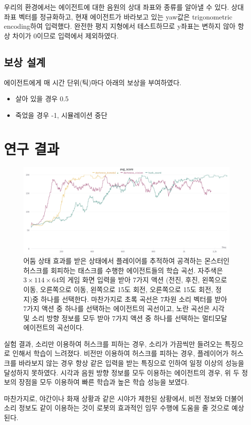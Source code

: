 \documentclass{tudelftposter}
\begin{document}
우리의 환경에서는 에이전트에 대한 음원의 상대 좌표와 종류를 알아낼 수 있다. 상대 좌표 벡터를 정규화하고, 현재 에이전트가 바라보고 있는 yaw값은 trigonometric encoding하여 입력했다. 완전한 평지 지형에서 테스트하므로 y좌표는 변하지 않아 항상 차이가 0이므로 입력에서 제외하였다. 

\subsection{보상 설계}
에이전트에게 매 시간 단위(틱)마다 아래의 보상을 부여하였다.
\begin{itemize}
  \item 살아 있을 경우 0.5
  \item 죽었을 경우 -1, 시뮬레이션 중단
\end{itemize}

\section{연구 결과}

\begin{figure}
  \centering
  \includegraphics[width=.5\textwidth]{result.png}
  \caption{어둠 상태 효과를 받은 상태에서 플레이어를 추적하여 공격하는 몬스터인 허스크를 회피하는 태스크를 수행한 에이전트들의 학습 곡선. 자주색은 $3\times114\times64$의 게임 화면 입력을 받아 7가지 액션 (전진, 후진, 왼쪽으로 이동, 오른쪽으로 이동, 왼쪽으로 15도 회전, 오른쪽으로 15도 회전, 정지)중 하나를 선택한다. 마찬가지로 초록 곡선은 7차원 소리 벡터를 받아 7가지 액션 중 하나를 선택하는 에이전트의 곡선이고, 노란 곡선은 시각 및 소리 방향 정보를 모두 받아 7가지 액션 중 하나를 선택하는 멀티모달 에이전트의 곡선이다.}
  \label{fig:block}
\end{figure}
실험 결과, 소리만 이용하여 허스크를 피하는 경우, 소리가 가끔씩만 들려오는 특징으로 인해서 학습이 느려졌다. 비전만 이용하여 허스크를 피하는 경우, 플레이어가 허스크를 바라보지 않는 경우 항상 같은 입력을 받는 특징으로 인하여 일정 이상의 성능을 달성하지 못하였다. 시각과 음원 방향 정보를 모두 이용하는 에이전트의 경우, 위 두 정보의 장점을 모두 이용하여 빠른 학습과 높은 학습 성능을 보였다.

마찬가지로, 야간이나 화재 상황과 같은 시야가 제한된 상황에서, 비전 정보와 더불어 소리 정보도 같이 이용하는 것이 로봇의 효과적인 임무 수행에 도움을 줄 것으로 예상된다.
\end{document}
